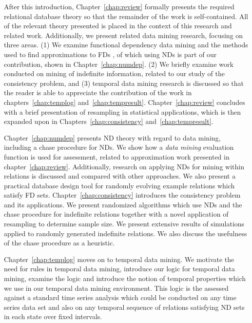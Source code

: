 After this introduction, Chapter~\ref{chap:review} formally presents
the required relational database theory so that the remainder of the
work is self-contained.  All of the relevant theory presented is
placed in the context of this research and related work. Additionally,
we present related data mining research, focusing on three areas. (1)
We examine functional dependency data mining and the methods used to
find approximations to FDs \cite{km95,at94,Mann92,sf93,HS95,pk95,bel95b,psm93}, of which using NDs is part of our
contribution, shown in Chapter~\ref{chap:numdep}. (2) We briefly examine work conducted on mining of
indefinite information, related to our study of the consistency
problem, and (3) temporal data mining research is discussed so that
the reader is able to appreciate the contribution of the
work in chapters~\ref{chap:templog}
and~\ref{chap:tempresult}. Chapter~\ref{chap:review} concludes with a
brief presentation of
resampling in statistical applications, which is then expanded upon in
Chapters~\ref{chap:consistency} and~\ref{chap:tempresult}.

\medskip

Chapter~\ref{chap:numdep} presents ND theory with regard to data
mining, including a chase procedure for NDs. We show how a
{\em data mining} evaluation function is used for assessment, related
to approximation work presented in
chapter~\ref{chap:review}. Additionally, research on applying NDs for
mining within relations is discussed and compared with other
approaches. We also present a practical database design tool for randomly
evolving example relations which satisfy FD sets.  Chapter~\ref{chap:consistency} introduces
the consistency problem and its applications. We present randomized
algorithms which use NDs and the chase procedure for indefinite
relations together with a novel application of resampling to determine
sample size. We present extensive results of simulations applied to
randomly generated indefinite relations. We also discuss the
usefulness of the chase procedure as a heuristic.

\medskip

Chapter~\ref{chap:templog} moves on to temporal data mining. We
motivate the need for rules in temporal data mining, introduce our
logic for temporal data mining, examine the logic and introduce the
notion of temporal properties which we use in our temporal data mining
environment. This logic is the assessed against a standard time series
analysis which could be conducted on any time series data set and also
on any temporal sequence of relations satisfying ND sets in each
state over fixed intervals.

